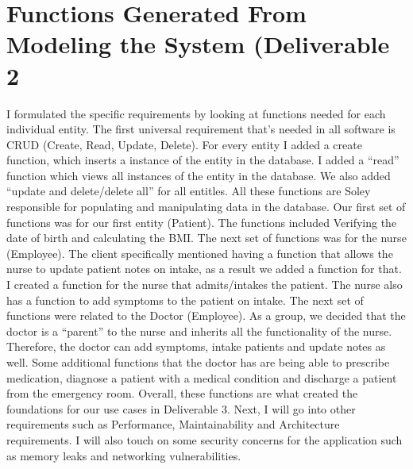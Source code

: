 \documentclass{article}
\begin{document}
\section{Functions Generated From Modeling the System (Deliverable 2}
\begin{multicols}{2}

I formulated the specific requirements by looking at functions needed for each individual entity. The first universal requirement that’s needed in all software is CRUD (Create, Read, Update, Delete). For every entity I added a create function, which inserts a instance of the entity in the database. I added a “read” function which views all instances of the entity in the database. We also added “update and delete/delete all” for all entitles. All these functions are Soley responsible for populating and manipulating data in the database. Our first set of functions was for our first entity (Patient). The functions included Verifying the date of birth and calculating the BMI. The next set of functions was for the nurse (Employee). The client specifically mentioned having a function that allows the nurse to update patient notes on intake, as a result we added a function for that. I created a function for the nurse that admits/intakes the patient. The nurse also has a function to add symptoms to the patient on intake. The next set of functions were related to the Doctor (Employee). As a group, we decided that the doctor is a “parent” to the nurse and inherits all the functionality of the nurse. Therefore, the doctor can add symptoms, intake patients and update notes as well. Some additional functions that the doctor has are being able to prescribe medication, diagnose a patient with a medical condition and discharge a patient from the emergency room. Overall, these functions are what created the foundations for our use cases in Deliverable 3. Next, I will go into other requirements such as Performance, Maintainability and Architecture requirements. I will also touch on some security concerns for the application such as memory leaks and networking vulnerabilities. 

\end{multicols}
\end{document}
